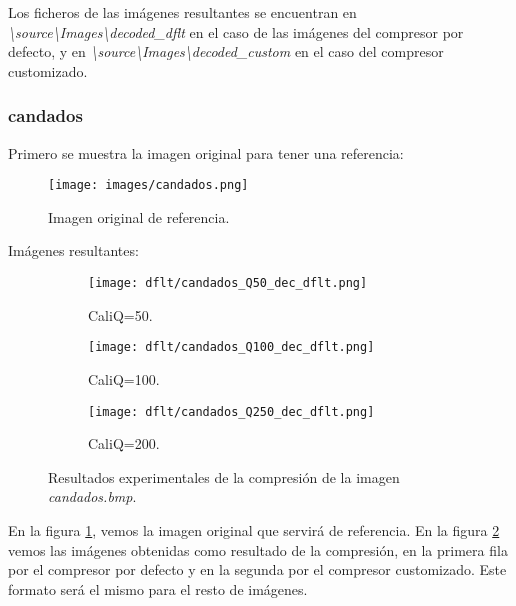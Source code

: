 \documentclass[12pt,a4paper]{article}
\begin{document}
Los ficheros de las imágenes resultantes se encuentran en \textit{\textbackslash source\textbackslash Images\textbackslash decoded\_dflt} en el caso de las imágenes del compresor por defecto, y en \textit{\textbackslash source\textbackslash Images\textbackslash decoded\_custom} en el caso del compresor customizado.

\subsubsection{candados}
Primero se muestra la imagen original para tener una referencia:
\begin{figure}[H]
    \centering
    \texttt{[image: images/candados.png]}
    \caption[Referencia - candados]{Imagen original de referencia.}
    \label{fig:top_candados}
\end{figure}
    \vspace{0.5cm}

Imágenes resultantes:
\begin{figure}   [H]
    \begin{subfigure}{0.20\textwidth}
        \centering
        \texttt{[image: dflt/candados\_Q50\_dec\_dflt.png]}
        \caption{CaliQ=50.}
        
    \end{subfigure}
    \hfill
    \begin{subfigure}{0.20\textwidth}
        \centering
        \texttt{[image: dflt/candados\_Q100\_dec\_dflt.png]}
        \caption{CaliQ=100.}
        
    \end{subfigure}
    \hfill
    \begin{subfigure}{0.20\textwidth}
        \centering
        \texttt{[image: dflt/candados\_Q250\_dec\_dflt.png]}
        \caption{CaliQ=200.}
        
    \end{subfigure}
    
    
    \caption[Resultados experimentales - candado]{Resultados experimentales de la compresión de la imagen \textit{candados.bmp}.}
    \label{fig:candados_cuali}
\end{figure}

En la figura \ref{fig:top_candados}, vemos la imagen original que servirá de referencia. En la figura \ref{fig:candados_cuali} vemos las imágenes obtenidas como resultado de la compresión, en la primera fila por el compresor por defecto y en la segunda por el compresor customizado. Este formato será el mismo para el resto de imágenes.\\
\end{document}
